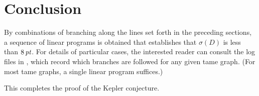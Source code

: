 \documentclass[onecolumn]{newsiambook}
\def\shortversion#1{#1}
\def\shortversion#1{}
\begin{document}
\shortversion{
    \label{part:tame}
    
    
    }

\section{Conclusion}

By combinations of branching along the lines set forth in the
preceding sections, a sequence of linear programs is obtained that
establishes that  $\sigma(D)$ is less than $8\,\hbox{\it pt}$.  For details
of particular cases, the interested reader can consult the log
files in \cite{web}, which record which branches are followed for
any given tame graph.  (For most tame graphs, a single linear
program suffices.)

\smallskip

This completes the \shortversion{(abridged)} proof of the Kepler
conjecture.


\backmatter



\printindex
\end{document}
